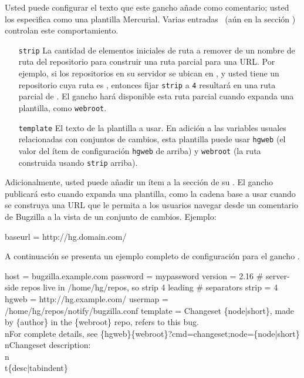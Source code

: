 Usted puede configurar el texto que este gancho añade como comentario;
usted los especifica como una plantilla Mercurial. Varias entradas
\hgrc\ (aún en la sección ) controlan este
comportamiento.
\begin{itemize}
\item[\texttt{strip}] La cantidad de elementos iniciales de ruta a
  remover de un nombre de ruta del repositorio para construir una ruta
  parcial para una URL. Por ejemplo, si los repositorios en su
  servidor se ubican en , y usted tiene un
  repositorio cuya ruta es ,
  entonces fijar \texttt{strip} a \texttt{4} resultará en una ruta
  parcial de .  El gancho hará disponible esta ruta
  parcial cuando expanda una plantilla, como \texttt{webroot}.
\item[\texttt{template}] El texto de la plantilla a usar. En adición a
  las variables usuales relacionadas con conjuntos de cambios, esta
  plantilla puede usar \texttt{hgweb} (el valor del ítem de
  configuración \texttt{hgweb} de arriba) y \texttt{webroot} (la ruta
  construida usando \texttt{strip} arriba).
\end{itemize}

Adicionalmente, usted puede añadir un ítem  a la
sección  de su \hgrc.  El gancho 
publicará esto cuando expanda una plantilla, como la cadena base a
usar cuando se construya una URL que le permita a los usuarios navegar
desde un comentario de Bugzilla a la vista de un conjunto de cambios.
Ejemplo:
\begin{codesample2}
  [web]
  baseurl = http://hg.domain.com/
\end{codesample2}

A continuación se presenta un ejemplo completo de configuración para
el gancho .
\begin{codesample2}
  [bugzilla]
  host = bugzilla.example.com
  password = mypassword
  version = 2.16
  # server-side repos live in /home/hg/repos, so strip 4 leading
  # separators
  strip = 4
  hgweb = http://hg.example.com/
  usermap = /home/hg/repos/notify/bugzilla.conf
  template = Changeset \{node|short\}, made by \{author\} in the \{webroot\}
    repo, refers to this bug.\\nFor complete details, see 
    \{hgweb\}\{webroot\}?cmd=changeset;node=\{node|short\}\\nChangeset
    description:\\n\\t\{desc|tabindent\}
\end{codesample2}

